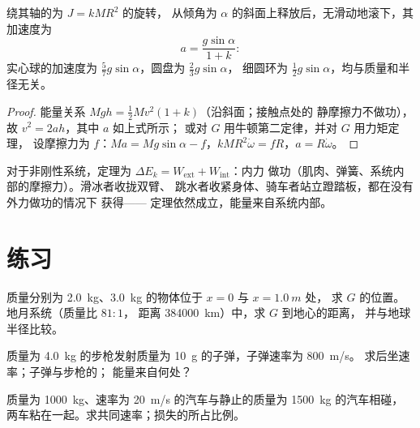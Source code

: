 \begin{proposition}[无滑动地沿斜面滚动]\label{prop:b1:systems-of-points:rollingincline}
绕其轴的为 $J = kMR^2$ 的旋转，
从倾角为 $\alpha$ 的斜面上释放后，无滑动地滚下，其加速度为
\[
a = \frac{g\sin\alpha}{1 + k} :
\]
实心球的加速度为 $\tfrac57 g\sin\alpha$，圆盘为 $\tfrac23 g\sin\alpha$，
细圆环为 $\tfrac12 g\sin\alpha$，均与质量和半径无关。
\end{proposition}

\begin{proof}
能量关系 $Mgh = \tfrac12 Mv^2(1 + k)$（沿斜面；接触点处的
静摩擦力不做功），故 $v^2 = 2ah$，其中 $a$ 如上式所示；
或对 $G$ 用牛顿第二定律，并对 $G$ 用力矩定理，
设摩擦力为 $f$：$Ma = Mg\sin\alpha - f$，$kMR^2\dot\omega = fR$，$a = R\dot\omega$。
\end{proof}

\begin{remark}[可变形系统]\label{rem:b1:systems-of-points:deformable}
对于非刚性系统，定理为
$\Delta E_k = W_{\mathrm{ext}} + W_{\mathrm{int}}$：内力
做功（肌肉、弹簧、系统内部的摩擦力）。滑冰者收拢双臂、
跳水者收紧身体、骑车者站立蹬踏板，都在没有外力做功的情况下
获得——
定理依然成立，能量来自系统内部。
\end{remark}

\section{练习}

\begin{exercise}[$\star$]\label{exo:b1:systems-of-points:1}
质量分别为 \qty{2.0}{kg}、\qty{3.0}{kg} 的物体位于 $x = 0$ 与 $x = \qty{1.0}{m}$ 处，
求 $G$ 的位置。地月系统（质量比 $81:1$，
距离 \qty{384000}{km}）中，求 $G$ 到地心的距离，
并与地球半径比较。
\end{exercise}

\begin{exercise}[$\star$]\label{exo:b1:systems-of-points:2}
质量为 \qty{4.0}{kg} 的步枪发射质量为 \qty{10}{g} 的子弹，子弹速率为 \qty{800}{m/s}。
求后坐速率；子弹与步枪的；
能量来自何处？
\end{exercise}

\begin{exercise}[$\star$]\label{exo:b1:systems-of-points:3}
质量为 \qty{1000}{kg}、速率为 \qty{20}{m/s} 的汽车与静止的质量为 \qty{1500}{kg} 的汽车相碰，
两车粘在一起。求共同速率；损失的所占比例。
\end{exercise}

